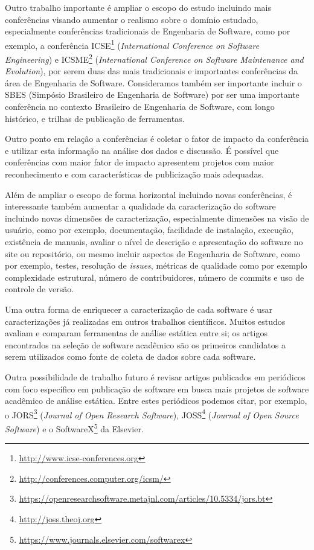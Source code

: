 Outro trabalho importante é ampliar o escopo do estudo incluindo mais
conferências visando aumentar o realismo sobre o domínio estudado,
especialmente conferências tradicionais de Engenharia de Software, como por
exemplo, a conferência ICSE\footnote{\url{http://www.icse-conferences.org}}
({\it International Conference on Software Engineering}) e
ICSME\footnote{\url{http://conferences.computer.org/icsm/}} ({\it International
Conference on Software Maintenance and Evolution}), por serem duas das mais
tradicionais e importantes conferências da área de Engenharia de Software.
Consideramos também ser importante incluir o SBES (Simpósio Brasileiro de
Engenharia de Software) por ser uma importante conferência no contexto
Brasileiro de Engenharia de Software, com longo histórico, e trilhas de
publicação de ferramentas.

Outro ponto em relação a conferências é coletar o fator de impacto da
conferência e utilizar esta informação na análise dos dados e discussão. É
possível que conferências com maior fator de impacto apresentem projetos com
maior reconhecimento e com características de publicização mais adequadas.

Além de ampliar o escopo de forma horizontal incluindo novas conferências, é
interessante também aumentar a qualidade da caracterização do software
incluindo novas dimensões de caracterização, especialmente dimensões na visão
de usuário, como por exemplo, documentação, facilidade de instalação, execução,
existência de manuais, avaliar o nível de descrição e apresentação do software
no site ou repositório, ou mesmo incluir aspectos de Engenharia de Software,
como por exemplo, testes, resolução de {\it issues}, métricas de qualidade como
por exemplo complexidade estrutural, número de contribuidores, número de
commits e uso de controle de versão.

Uma outra forma de enriquecer a caracterização de cada software é usar
caracterizações já realizadas em outros trabalhos científicos. Muitos estudos
avaliam e comparam ferramentas de análise estática entre si; os artigos
encontrados na seleção de software acadêmico são os primeiros candidatos a
serem utilizados como fonte de coleta de dados sobre cada software.

Outra possibilidade de trabalho futuro é revisar artigos publicados em periódicos
com foco específico em publicação de software em busca mais projetos de
software acadêmico de análise estática. Entre estes periódicos podemos citar, por
exemplo, o JORS\footnote{\url{https://openresearchsoftware.metajnl.com/articles/10.5334/jors.bt}} ({\it Journal of Open Research
Software}),
JOSS\footnote{\url{http://joss.theoj.org}} ({\it Journal of Open Source Software}) \cite{smith2017journal} e
o SoftwareX\footnote{\url{https://www.journals.elsevier.com/softwarex}} da
Elsevier.
